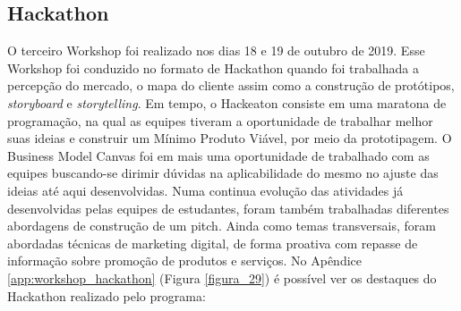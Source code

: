\subsection{Hackathon}

O terceiro Workshop foi realizado nos dias 18 e 19 de outubro de 2019. Esse Workshop foi conduzido no formato de Hackathon quando foi trabalhada a percepção do mercado, o mapa do cliente assim como a construção de protótipos, \textit{storyboard} e \textit{storytelling}. Em tempo, o Hackeaton consiste em uma maratona de programação, na qual as equipes tiveram a oportunidade de trabalhar melhor suas ideias e construir um Mínimo Produto Viável, por meio da prototipagem. O Business Model Canvas foi em mais uma oportunidade de trabalhado com as equipes buscando-se dirimir dúvidas na aplicabilidade do mesmo no ajuste das ideias até aqui desenvolvidas.
Numa continua evolução das atividades já desenvolvidas pelas equipes de estudantes, foram também trabalhadas diferentes abordagens de construção de um pitch. Ainda como temas transversais, foram abordadas técnicas de marketing digital, de forma proativa com repasse de informação sobre promoção de produtos e serviços. No Apêndice \ref{app:workshop_hackathon} (Figura \ref{figura_29}) é possível ver os destaques do Hackathon realizado pelo programa:


